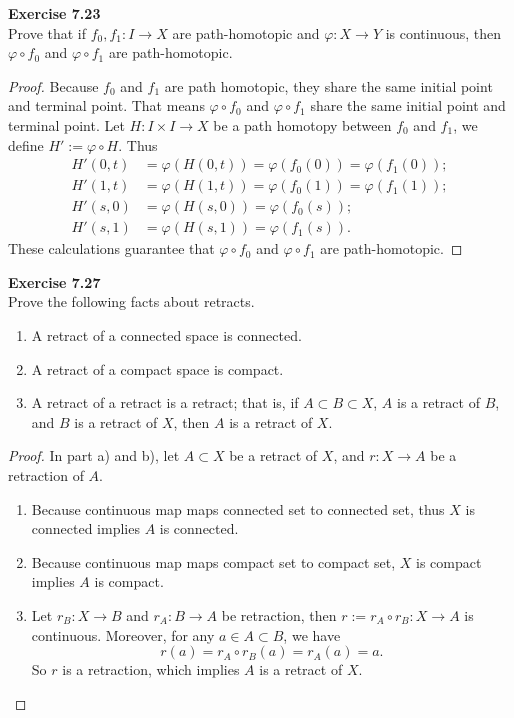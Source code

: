 \documentclass[12pt, a4paper]{article}
\theoremstyle{plain}
\newenvironment{exercise}[2][Exercise]
    { \begin{mdframed}[backgroundcolor=gray!20] \textbf{#1 #2} \\}
    {  \end{mdframed}}
\begin{document}
\begin{exercise}{7.23}
    Prove that if $f_0,f_1\colon I\to X$ are path-homotopic and $\varphi\colon X\to Y$ is continuous, then $\varphi \circ f_0$ and $\varphi\circ f_1$ are path-homotopic.
\end{exercise}
    \begin{proof}
        Because $f_0$ and $f_1$ are path homotopic, they share the same initial point and terminal point. That means $\varphi\circ f_0$ and $\varphi\circ f_1$ share the same initial point and terminal point. Let $H\colon I\times I\to X$ be a path homotopy between $f_0$ and $f_1$, we define $H':= \varphi\circ H$. Thus
        \begin{align*}
            H'(0,t) &= \varphi(H(0,t))=\varphi(f_0(0))=\varphi(f_1(0));\\
            H'(1,t) &= \varphi(H(1,t))=\varphi(f_0(1))=\varphi(f_1(1));\\
            H'(s,0) &= \varphi(H(s,0))=\varphi(f_0(s));\\
            H'(s,1) &= \varphi(H(s,1))=\varphi(f_1(s)).
        \end{align*}
        These calculations guarantee that $\varphi \circ f_0$ and $\varphi\circ f_1$ are path-homotopic.
    \end{proof}

\begin{exercise}{7.27}
    Prove the following facts about retracts.
    \begin{enumerate}[label=(\alph*)]
        \item A retract of a connected space is connected.\\
        \item A retract of a compact space is compact.\\
        \item A retract of a retract is a retract; that is, if $A\subset B\subset X$, $A$ is a retract of $B$, and $B$ is a retract of $X$, then $A$ is a retract of $X$.
    \end{enumerate}
\end{exercise}
    \begin{proof}
    In part a) and b), let $A\subset X$ be a retract of $X$, and $r\colon X\to A$ be a retraction of $A$.
    \begin{enumerate}[label=(\alph*)]
        \item Because continuous map maps connected set to connected set, thus $X$ is connected implies $A$ is connected.
        \item Because continuous map maps compact set to compact set, $X$ is compact implies $A$ is compact.
        \item Let $r_B\colon X\to B$ and $r_A\colon B\to A$ be retraction, then $r:=r_A\circ r_B\colon X\to A$ is continuous. Moreover, for any $a\in A\subset B$, we have
        \[
        r(a) = r_A\circ r_B(a) = r_A(a)=a.
        \]
        So $r$ is a retraction, which implies $A$ is a retract of $X$.
    \end{enumerate}
    \end{proof}
\end{document}
